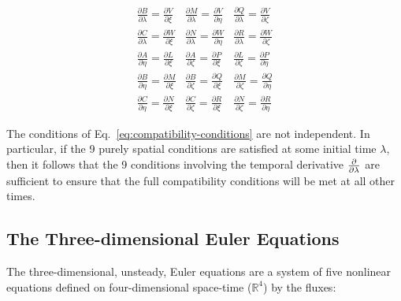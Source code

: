 \begin{equation}
\begin{array}{*{20}{c}}
{\frac{{\partial B}}{{\partial \lambda }} = \frac{{\partial V}}{{\partial \xi }}}&{\frac{{\partial M}}{{\partial \lambda }} = \frac{{\partial V}}{{\partial \eta }}}&{\frac{{\partial Q}}{{\partial \lambda }} = \frac{{\partial V}}{{\partial \zeta }}}\\
{\frac{{\partial C}}{{\partial \lambda }} = \frac{{\partial W}}{{\partial \xi }}}&{\frac{{\partial N}}{{\partial \lambda }} = \frac{{\partial W}}{{\partial \eta }}}&{\frac{{\partial R}}{{\partial \lambda }} = \frac{{\partial W}}{{\partial \zeta }}}\\
{\frac{{\partial A}}{{\partial \eta }} = \frac{{\partial L}}{{\partial \xi }}}&{\frac{{\partial A}}{{\partial \zeta }} = \frac{{\partial P}}{{\partial \xi }}}&{\frac{{\partial L}}{{\partial \zeta }} = \frac{{\partial P}}{{\partial \eta }}}\\
{\frac{{\partial B}}{{\partial \eta }} = \frac{{\partial M}}{{\partial \xi }}}&{\frac{{\partial B}}{{\partial \zeta }} = \frac{{\partial Q}}{{\partial \xi }}}&{\frac{{\partial M}}{{\partial \zeta }} = \frac{{\partial Q}}{{\partial \eta }}}\\
{\frac{{\partial C}}{{\partial \eta }} = \frac{{\partial N}}{{\partial \xi }}}&{\frac{{\partial C}}{{\partial \zeta }} = \frac{{\partial R}}{{\partial \xi }}}&{\frac{{\partial N}}{{\partial \zeta }} = \frac{{\partial R}}{{\partial \eta }}}
\end{array}
\end{equation}

The conditions of Eq.~\ref{eq:compatibility-conditions} are not independent. In particular, if the 9 purely spatial conditions are satisfied at some initial time $\lambda$, then it follows that the 9 conditions involving the temporal derivative  $\frac{\partial }{\partial \lambda}$ are sufficient to ensure that the full compatibility conditions will be met at all other times.

\subsection{The Three-dimensional Euler Equations}
\label{sec:UCS-3D-Euler}

The three-dimensional, unsteady, Euler equations are a system of five nonlinear equations defined on four-dimensional space-time ($\mathbb{R}^4$) by the fluxes:

